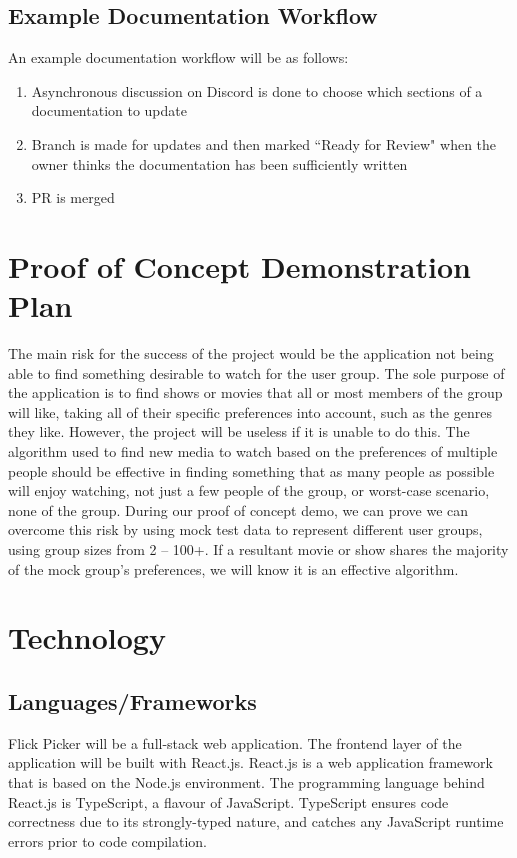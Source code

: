 \documentclass{article}
\begin{document}
\subsection{Example Documentation Workflow}
An example documentation workflow will be as follows:
\begin{enumerate}
	\item Asynchronous discussion on Discord is done to choose which sections of a documentation to update
	\item Branch is made for updates and then marked ``Ready for Review" when the owner thinks the documentation has been sufficiently written
	\item PR is merged
\end{enumerate}

\section{Proof of Concept Demonstration Plan}

The main risk for the success of the project would be the application not being able to find something desirable to watch for the user group. The sole purpose of the application is to find shows or movies that all or most members of the group will like, taking all of their specific preferences into account, such as the genres they like. However, the project will be useless if it is unable to do this.
The algorithm used to find new media to watch based on the preferences of multiple people should be effective in finding something that as many people as possible will enjoy watching, not just a few people of the group, or worst-case scenario, none of the group. 
During our proof of concept demo, we can prove we can overcome this risk by using mock test data to represent different user groups, using group sizes from 2 – 100+. If a resultant movie or show shares the majority of the mock group’s preferences, we will know it is an effective algorithm.


\section{Technology}
	

\subsection{Languages/Frameworks}

Flick Picker will be a full-stack web application. The frontend layer of the application will be built with React.js. React.js is a web application framework that is based on the Node.js environment. The programming language behind React.js is TypeScript, a flavour of JavaScript. TypeScript ensures code correctness due to its strongly-typed nature, and catches any JavaScript runtime errors prior to code compilation.
\end{document}
